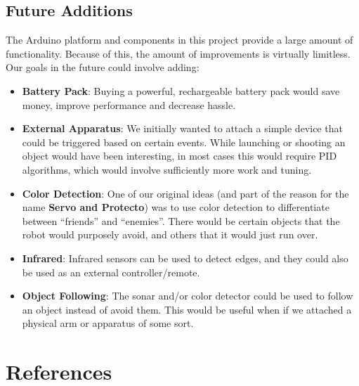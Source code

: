 \documentclass[11pt]{article}
\begin{document}
\subsection{Future Additions}
The Arduino platform and components in this project provide a large amount of functionality.  Because of this, the amount of improvements is virtually limitless.  Our goals in the future could involve adding:
		\begin{itemize}				
		\item \textbf{Battery Pack}: Buying a powerful, rechargeable battery pack would save money, improve performance and decrease hassle.
		\item \textbf{External Apparatus}: We initially wanted to attach a simple device that could be triggered based on certain events.  While launching or shooting an object would have been interesting, in most cases this would require PID algorithms, which would involve sufficiently more work and tuning.
		\item \textbf{Color Detection}: One of our original ideas (and part of the reason for the name \textbf{Servo and Protecto}) was to use color detection to differentiate between ``friends'' and ``enemies''.  There would be certain objects that the robot would purposely avoid, and others that it would just run over.
		\item \textbf{Infrared}: Infrared sensors can be used to detect edges, and they could also be used as an external controller/remote.
		\item \textbf{Object Following}: The sonar and/or color detector could be used to follow an object instead of avoid them.  This would be useful when if we attached a physical arm or apparatus of some sort.
		\end{itemize}


\section{References}
\end{document}
